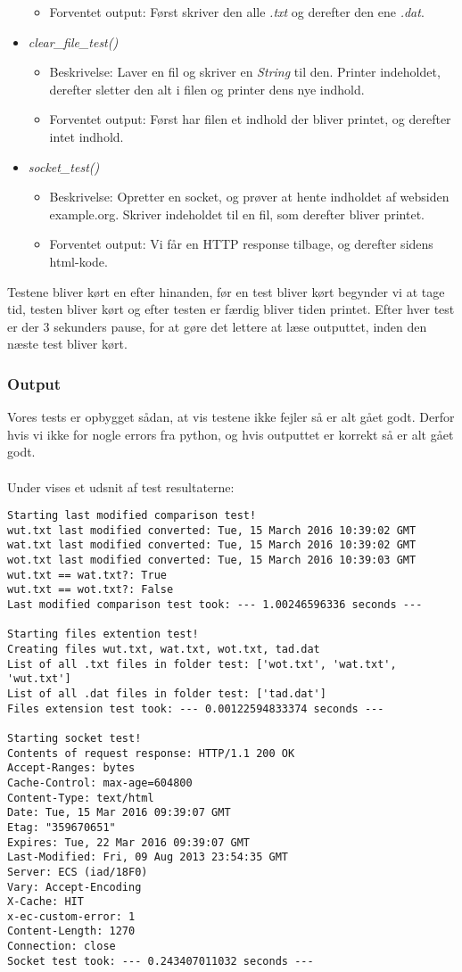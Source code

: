 \documentclass[11pt]{article}
\begin{document}
\begin{itemize}
\begin{itemize}
  \item Forventet output: Først skriver den alle \textit{.txt} og derefter den ene \textit{.dat}.
  \end{itemize}
\item \textit{clear\_file\_test()}
  \begin{itemize}
  \item Beskrivelse: Laver en fil og skriver en \textit{String} til den. Printer indeholdet, derefter sletter den alt i filen og printer dens nye indhold.
  \item Forventet output: Først har filen et indhold der bliver printet, og derefter intet indhold.
  \end{itemize}
\item \textit{socket\_test()}
  \begin{itemize}
  \item Beskrivelse: Opretter en socket, og prøver at hente indholdet af websiden example.org. Skriver indeholdet til en fil, som derefter bliver printet.
  \item Forventet output: Vi får en HTTP response tilbage, og derefter sidens html-kode.
  \end{itemize}
\end{itemize}
Testene bliver kørt en efter hinanden, før en test bliver kørt begynder vi at tage tid, testen bliver kørt og efter testen er færdig bliver tiden printet. Efter hver test er der 3 sekunders pause, for at gøre det lettere at læse outputtet, inden den næste test bliver kørt.
\subsubsection{Output}
Vores tests er opbygget sådan, at vis testene ikke fejler så er alt gået godt. Derfor hvis vi ikke for nogle errors fra python, og hvis outputtet er korrekt så er alt gået godt. \\ \\
Under vises et udsnit af test resultaterne:
\begin{verbatim}
Starting last modified comparison test!
wut.txt last modified converted: Tue, 15 March 2016 10:39:02 GMT
wat.txt last modified converted: Tue, 15 March 2016 10:39:02 GMT
wot.txt last modified converted: Tue, 15 March 2016 10:39:03 GMT
wut.txt == wat.txt?: True
wut.txt == wot.txt?: False
Last modified comparison test took: --- 1.00246596336 seconds ---

Starting files extention test!
Creating files wut.txt, wat.txt, wot.txt, tad.dat
List of all .txt files in folder test: ['wot.txt', 'wat.txt', 'wut.txt']
List of all .dat files in folder test: ['tad.dat']
Files extension test took: --- 0.00122594833374 seconds ---

Starting socket test!
Contents of request response: HTTP/1.1 200 OK
Accept-Ranges: bytes
Cache-Control: max-age=604800
Content-Type: text/html
Date: Tue, 15 Mar 2016 09:39:07 GMT
Etag: "359670651"
Expires: Tue, 22 Mar 2016 09:39:07 GMT
Last-Modified: Fri, 09 Aug 2013 23:54:35 GMT
Server: ECS (iad/18F0)
Vary: Accept-Encoding
X-Cache: HIT
x-ec-custom-error: 1
Content-Length: 1270
Connection: close
Socket test took: --- 0.243407011032 seconds ---

\end{verbatim}
\end{document}
